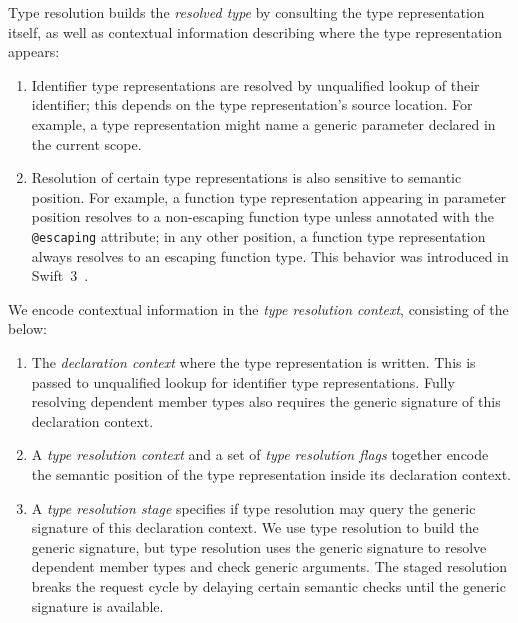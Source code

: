 \documentclass[../generics]{subfiles}
\begin{document}
Type resolution builds the \emph{resolved type} by consulting the type representation itself, as well as contextual information describing where the type representation appears:
\begin{enumerate}
\item Identifier type representations are resolved by unqualified lookup of their identifier; this depends on the type representation's source location. For example, a type representation might name a generic parameter declared in the current scope.
\item Resolution of certain type representations is also sensitive to semantic position. For example, a function type representation appearing in parameter position resolves to a non-escaping function type unless annotated with the \texttt{@escaping} attribute; in any other position, a function type representation always resolves to an escaping function type. This behavior was introduced in Swift~3~\cite{se0103}.
\end{enumerate}
We encode contextual information in the \emph{type resolution context}, consisting of the below:
\begin{enumerate}
\item The \emph{declaration context} where the type representation is written. This is passed to unqualified lookup for identifier type representations. Fully resolving dependent member types also requires the generic signature of this declaration context.
\item A \emph{type resolution context} and a set of \emph{type resolution flags} together encode the semantic position of the type representation inside its declaration context.
\item A \emph{type resolution stage} specifies if type resolution may query the generic signature of this declaration context. We use type resolution to build the generic signature, but type resolution uses the generic signature to resolve dependent member types and check generic arguments. The staged resolution breaks the request cycle by delaying certain semantic checks until the generic signature is available.
\end{enumerate}
\end{document}
